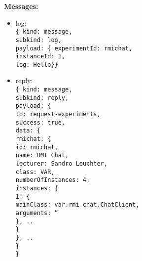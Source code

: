 \textbf{Messages:}
\begin{itemize}
  \item log:
    \\\texttt{\{ kind: message, \\subkind: log,
    \\ payload: \{ experimentId: rmichat, \\\hspace*{1.8cm}instanceId: 1, \\\hspace*{1.8cm}log: Hello\}\}}
  \item reply:
    \\\texttt{\{ kind: message, \\subkind: reply,
      \\ payload: \{ \\\hspace*{0.8cm}to: request-experiments, \\\hspace*{0.8cm}success: true, \\\hspace*{0.8cm}data: \{ \\\hspace*{1.6cm}rmichat: \{ \\\hspace*{2.4cm}id: rmichat, \\\hspace*{2.4cm}name: RMI Chat, \\\hspace*{2.4cm}lecturer: Sandro Leuchter, \\\hspace*{2.4cm}class: VAR, \\\hspace*{2.4cm}numberOfInstances: 4, \\\hspace*{2.4cm}instances: \{ \\\hspace*{3.2cm}1: \{ \\\hspace*{4cm}mainClass: var.rmi.chat.ChatClient, \\\hspace*{4cm}arguments: '' \\\hspace*{3.2cm}\}, .. \\\hspace*{2.4cm}\}\\\hspace*{1.6cm}\}, ..\\\hspace*{0.8cm}\}\\\}}
\end{itemize}
\clearpage

